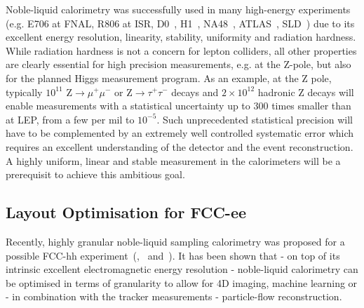 
Noble-liquid calorimetry was successfully used in many high-energy experiments (e.g. E706 at FNAL, R806 at ISR, D0~\cite{D0:1993bqa}, H1~\cite{ANDRIEU1993460}, NA48~\cite{Unal:2000eu}, ATLAS~\cite{CERN-LHCC-96-041}, SLD~\cite{Benvenuti:1989ht}) due to its excellent energy resolution, linearity, stability, uniformity and radiation hardness. While radiation hardness is not a concern for lepton colliders, all other properties are clearly essential for high precision measurements, e.g. at the Z-pole, but also for the planned Higgs measurement program. 
As an example, at the Z pole, typically $10^{11}$ $\mathrm{Z}\rightarrow\mu^+\mu^-$ or Z$\rightarrow\tau^+\tau^-$ decays and $2\times 10^{12}$ hadronic Z decays will enable measurements with a statistical uncertainty up to 300 times smaller than at LEP, from a few per mil to $10^{-5}$. Such unprecedented statistical precision will have to be complemented by an extremely well controlled systematic error which requires an excellent understanding of the detector and the event reconstruction.  
A highly uniform, linear and stable measurement in the calorimeters will be a prerequisit to achieve this ambitious goal.

\subsection{Layout Optimisation for FCC-ee}
Recently, highly granular noble-liquid sampling calorimetry was proposed for a possible FCC-hh experiment~(\cite{Benedikt:2651300},~\cite{aleksa2019calorimeters} and~\cite{Aleksa:2020qdy}). It has been shown that - on top of its intrinsic excellent electromagnetic energy resolution - noble-liquid calorimetry can be optimised in terms of granularity to allow for 4D imaging, machine learning or - in combination with the tracker measurements - particle-flow reconstruction.  

